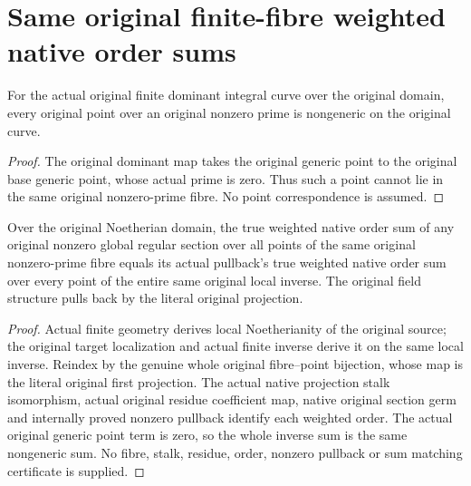 \section{Same original finite-fibre weighted native order sums}

\begin{theorem}
\label{thm:fc-original-nonzero-prime-fibre-nongeneric}
\leanok
{}
For the actual original finite dominant integral curve over the original
domain, every original point over an original nonzero prime is nongeneric
on the original curve.
\end{theorem}
\begin{proof}
The original dominant map takes the original generic point to the original
base generic point, whose actual prime is zero.  Thus such a point cannot
lie in the same original nonzero-prime fibre.  No point correspondence is
assumed.
\end{proof}

\begin{theorem}
\label{thm:fc-original-fibre-native-order-local-inverse-sum}
\leanok
{}
Over the original Noetherian domain, the true weighted native order sum of
any original nonzero global regular section over all points of the same
original nonzero-prime fibre equals its actual pullback's true weighted
native order sum over every point of the entire same original local inverse.
The original field structure pulls back by the literal original projection.
\end{theorem}
\begin{proof}
Actual finite geometry derives local Noetherianity of the original source;
the original target localization and actual finite inverse derive it on
the same local inverse.  Reindex by the genuine whole original fibre--point
bijection, whose map is the literal original first projection.  The actual
native projection stalk isomorphism, actual original residue coefficient
map, native original section germ and internally proved nonzero pullback
identify each weighted order.  The actual original generic point term is
zero, so the whole inverse sum is the same nongeneric sum.  No fibre, stalk,
residue, order, nonzero pullback or sum matching certificate is supplied.
\end{proof}
